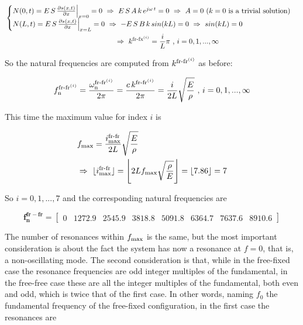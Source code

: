 \documentclass[a4paper,12pt,oneside]{article}
\begin{document}
\[ \begin{split}
	& \begin{cases}
			N(0,t) = E \, S \, \frac{\partial s(x,t)}{\partial x} \Big|_{x=0} = 0 %
				~ \Rightarrow ~ E \, S \, A \, k \, e^{j \omega \, t} = 0 %
				~ \Rightarrow ~ A = 0 ~ \text{($ k = 0 $ is a trivial solution)} \\
			N(L,t) = E \, S \, \frac{\partial s(x,t)}{\partial x} \Big|_{x=L} = 0 %
				~ \Rightarrow ~ - E \, S \, B \, k \, sin(kL) = 0 ~ \Rightarrow ~ sin(kL) = 0
	\end{cases}	\\
	& \hspace{150pt}~ \Rightarrow ~ %
		k^{\textup{fr-fx}^{(i)}} = \frac{i}{L} \pi ~ \text{,} ~ i = 0,1,...,\infty
\end{split} \]

So the natural frequencies are computed from $ k^{\textup{fr-fr}^{(i)}} $ as before:

\[
	f_\textup{n}^{\textup{fr-fr}^{(i)}} = %
		\frac{\omega_\textup{n}^{\textup{fr-fr}^{(i)}}}{2 \pi} = %
		\frac{c \, k^{\textup{fr-fr}^{(i)}}}{2 \pi} = %
		\frac{i}{2L} \sqrt{\frac{E}{\rho}} ~ \text{,} ~ i = 0,1,...,\infty
\]

This time the maximum value for index $ i $ is

\[ \begin{split}
	& f_\textup{max} = \frac{i^\textup{fr-fr}_\textup{max}}{2L} %
		\sqrt{\frac{E}{\rho}} \\
	& \Rightarrow ~ \lfloor i^\textup{fr-fr}_\textup{max} \rfloor = %
		\Biggl\lfloor 2 L f_\textup{max} \sqrt{\frac{\rho}{E}} \Biggr\rfloor = %
		\lfloor 7.86 \rfloor = 7
\end{split} \]

So $ i = 0,1,...,7 $ and the corresponding natural frequencies are

\[
	\mathbf{f_n^{fr-fr}} =	\begin{bmatrix}
																	0					& 1272.9	& 2545.9	& 3818.8 %
																	& 5091.8	& 6364.7	& 7637.6	& 8910.6
													\end{bmatrix}
\]

The number of resonances within $ f_\textup{max} $ is the same, but the most important consideration is about the fact the system has now a resonance at $ f = 0 $, that is, a non-oscillating mode. The second consideration is that, while in the free-fixed case the resonance frequencies are odd integer multiples of the fundamental, in the free-free case these are all the integer multiples of the fundamental, both even and odd, which is twice that of the first case. In other words, naming $ f_0 $ the fundamental frequency of the free-fixed configuration, in the first case the resonances are
\end{document}
